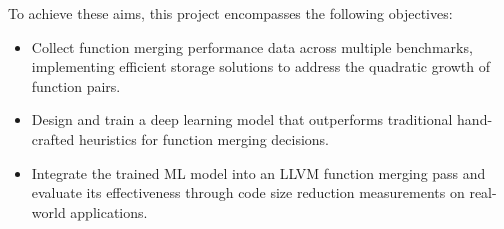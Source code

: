 To achieve these aims, this project encompasses the following objectives:
\begin{itemize}
    \item Collect function merging performance data across multiple benchmarks, implementing efficient storage solutions to address the quadratic growth of function pairs.
    \item Design and train a deep learning model that outperforms traditional hand-crafted heuristics for function merging decisions.
    \item Integrate the trained ML model into an LLVM function merging pass and evaluate its effectiveness through code size reduction measurements on real-world applications.
\end{itemize}












